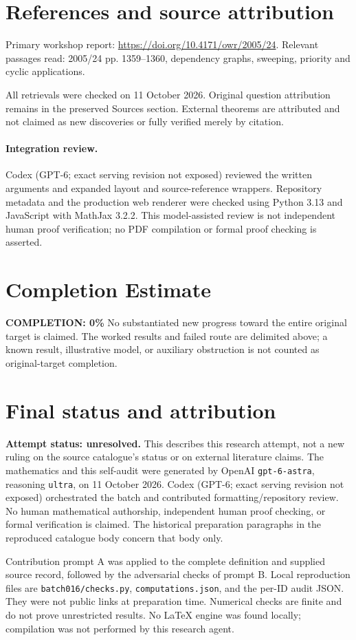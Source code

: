 \documentclass[11pt]{article}
\begin{document}
\section{References and source attribution}
Primary workshop report: \url{https://doi.org/10.4171/owr/2005/24}. Relevant passages read: 2005/24 pp. 1359--1360, dependency graphs, sweeping, priority and cyclic applications.

All retrievals were checked on 11 October 2026. Original question attribution remains in the preserved Sources section. External theorems are attributed and not claimed as new discoveries or fully verified merely by citation.


\paragraph{Integration review.} Codex (GPT-6; exact serving revision not exposed) reviewed the written arguments and expanded layout and source-reference wrappers. Repository metadata and the production web renderer were checked using Python 3.13 and JavaScript with MathJax 3.2.2. This model-assisted review is not independent human proof verification; no PDF compilation or formal proof checking is asserted.

\section{Completion Estimate}
\noindent\textbf{COMPLETION: 0\%}
No substantiated new progress toward the entire original target is claimed. The worked results and failed route are delimited above; a known result, illustrative model, or auxiliary obstruction is not counted as original-target completion.

\section{Final status and attribution}
\textbf{Attempt status: unresolved.} This describes this research attempt, not a new ruling on the source catalogue's status or on external literature claims.
The mathematics and this self-audit were generated by OpenAI \texttt{gpt-6-astra}, reasoning \texttt{ultra}, on 11 October 2026. Codex (GPT-6; exact serving revision not exposed) orchestrated the batch and contributed formatting/repository review. No human mathematical authorship, independent human proof checking, or formal verification is claimed. The historical preparation paragraphs in the reproduced catalogue body concern that body only.

Contribution prompt A was applied to the complete definition and supplied source record, followed by the adversarial checks of prompt B. Local reproduction files are \texttt{batch016/checks.py}, \texttt{computations.json}, and the per-ID audit JSON. They were not public links at preparation time. Numerical checks are finite and do not prove unrestricted results. No LaTeX engine was found locally; compilation was not performed by this research agent.
\end{document}
